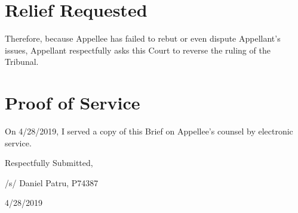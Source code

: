 \documentclass[12pt,\documentclassflag]{michiganCourtOfAppealsBrief}
\begin{document}
\section{Relief Requested}

Therefore, because Appellee has failed to rebut or even dispute Appellant's issues, Appellant respectfully asks this Court to reverse the ruling of the Tribunal. 

\section{Proof of Service}

On 4/28/2019, I served a copy of this Brief on Appellee's counsel by electronic service.

\vspace{1\baselineskip}

{ \setlength{\leftskip}{3.5in}

  Respectfully Submitted,

  /s/ Daniel Patru, P74387

  4/28/2019

  \setlength{\leftskip}{0pt}}

\newpage\empty%
\end{document}
